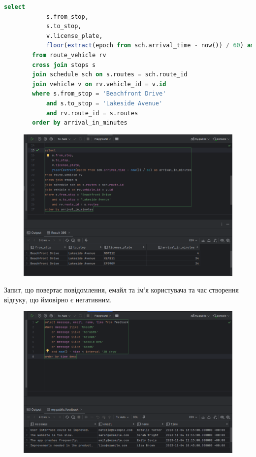 \documentclass[14pt]{extreport}
\begin{document}
\begin{normalsize}
\begin{lstlisting}[language=sql]
		select
			s.from_stop,
			s.to_stop,
			v.license_plate,
			floor(extract(epoch from sch.arrival_time - now()) / 60) as arrival_in_minutes
		from route_vehicle rv
		cross join stops s
		join schedule sch on s.routes = sch.route_id
		join vehicle v on rv.vehicle_id = v.id
		where s.from_stop = 'Beachfront Drive'
			and s.to_stop = 'Lakeside Avenue'
			and rv.route_id = s.routes
		order by arrival_in_minutes
	\end{lstlisting}
	\fi
	\begin{figure}[H]
		\centering
		\includegraphics[scale=0.5]{4}
		\caption{}
	\end{figure}
	
	Запит, що повертає повідомлення, емайл та ім'я користувача та час створення відгуку, що ймовірно є негативним.
	

	\begin{figure}[H]
		\centering
		\includegraphics[scale=0.5]{5}
		\caption{}
	\end{figure}
	

\end{normalsize}
\end{document}
